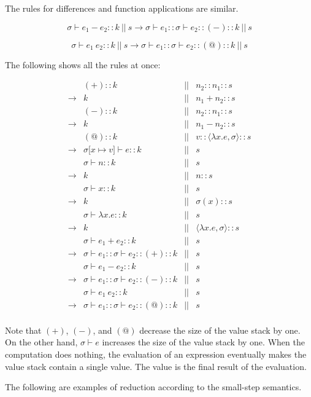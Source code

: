 The rules for differences and function applications are similar.

\[\sigma\vdash e_1-e_2::k\ ||\ s\rightarrow \sigma\vdash e_1::\sigma\vdash
e_2::(-)::k\ ||\ s\]

\[\sigma\vdash e_1\ e_2::k\ ||\ s\rightarrow \sigma\vdash e_1::\sigma\vdash
e_2::(@)::k\ ||\ s\]

The following shows all the rules at once:

\[
\begin{array}{lrcr}
&(+)::k& ||& n_2::n_1::s \\
\rightarrow& k& ||& n_1+n_2::s\\
&(-)::k& ||& n_2::n_1::s\\
\rightarrow& k& ||& n_1-n_2::s\\
&(@)::k& ||& v::\langle\lambda x.e,\sigma\rangle::s\\
\rightarrow& \sigma\lbrack x\mapsto v\rbrack\vdash e::k& ||& s\\
&\sigma\vdash n::k& ||&s\\
\rightarrow& k& ||&n::s\\
&\sigma\vdash x::k& ||&s\\
\rightarrow& k& ||& \sigma(x)::s\\
&\sigma\vdash \lambda x.e::k& ||& s\\
\rightarrow& k& ||&\langle\lambda x.e,\sigma\rangle ::s\\
&\sigma\vdash e_1+e_2::k& ||& s\\
\rightarrow& \sigma\vdash e_1::\sigma\vdash e_2::(+)::k& ||& s\\
&\sigma\vdash e_1-e_2::k& ||& s\\
\rightarrow& \sigma\vdash e_1::\sigma\vdash e_2::(-)::k& ||& s\\
&\sigma\vdash e_1\ e_2::k& ||& s\\
\rightarrow& \sigma\vdash e_1::\sigma\vdash e_2::(@)::k& ||& s\\
\end{array}
\]

Note that $(+)$, $(-)$, and $(@)$ decrease the size of the value stack by one. On
the other hand, $\sigma\vdash e$ increases the size of the value stack by one.
When the computation does nothing, the evaluation of an expression eventually
makes the value stack contain a single value. The value is the final result of
the evaluation.

The following are examples of reduction according to the small-step semantics.

